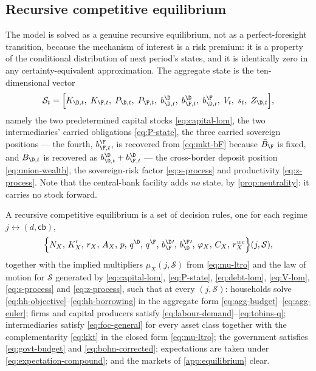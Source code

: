 \subsection{Recursive competitive equilibrium}
\label{sec:rce}

The model is solved as a genuine recursive equilibrium, not as a perfect-foresight
transition, because the mechanism of interest is a risk premium: it is a property
of the conditional distribution of next period's states, and it is identically
zero in any certainty-equivalent approximation. The aggregate state is the
ten-dimensional vector
\begin{equation}
\mathcal{S}_t=\Bigl[
K_{\D,t},\;K_{\F,t},\;
P_{\D,t},\;P_{\F,t},\;
b^{\D}_{\D,t},\;b^{\D}_{\F,t},\;b^{\F}_{\D,t},\;
V_t,\;s_t,\;Z_{\D,t}\Bigr],
\label{eq:state}
\end{equation}
namely the two predetermined capital stocks \eqref{eq:capital-lom}, the two
intermediaries' carried obligations \eqref{eq:P-state}, the three carried
sovereign positions --- the fourth, $b^{\F}_{\F,t}$, is recovered from
\eqref{eq:mkt-bF} because $\bar B_\F$ is fixed, and $B_{\D,t}$ is recovered as
$b^{\D}_{\D,t}+b^{\D}_{\F,t}$ --- the cross-border deposit position
\eqref{eq:union-wealth}, the sovereign-risk factor \eqref{eq:s-process} and
productivity \eqref{eq:z-process}. Note that the central-bank facility adds
\emph{no} state, by \cref{prop:neutrality}: it carries no stock forward.

\begin{definition}
\label{def:rce}
A recursive competitive equilibrium is a set of decision rules, one for each
regime $j\leftrightarrow(d,\mathsf{cb})$,
\[
\Bigl\{N_{X},\,K'_{X},\,r_{X},\,A_{X},\,p,\,q^{\D},\,q^{\F},\,
b^{\D}_{\F}{}',\,b^{\F}_{\D}{}',\,\varphi_{X},\,C_{X},\,r^{wc}_{X}\Bigr\}(j,\mathcal{S}),
\]
together with the implied multipliers $\mu_X(j,\mathcal{S})$ from
\eqref{eq:mu-ltro} and the law of motion for $\mathcal{S}$ generated by
\eqref{eq:capital-lom}, \eqref{eq:P-state}, \eqref{eq:debt-lom},
\eqref{eq:V-lom}, \eqref{eq:s-process} and \eqref{eq:z-process}, such that at
every $(j,\mathcal{S})$: households solve
\eqref{eq:hh-objective}--\eqref{eq:hh-borrowing} in the aggregate form
\eqref{eq:agg-budget}--\eqref{eq:agg-euler}; firms and capital producers satisfy
\eqref{eq:labour-demand}--\eqref{eq:tobins-q}; intermediaries satisfy
\eqref{eq:foc-general} for every asset class together with the complementarity
\eqref{eq:kkt} in the closed form \eqref{eq:mu-ltro}; the government satisfies
\eqref{eq:govt-budget} and \eqref{eq:bohn-corrected}; expectations are taken
under \eqref{eq:expectation-compound}; and the markets of
\cref{app:equilibrium} clear.
\end{definition}

